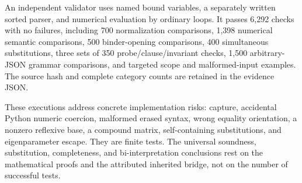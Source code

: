 An independent validator uses named bound variables, a separately
written sorted parser, and numerical evaluation by ordinary loops.
It passes 6,292 checks with no failures, including 700 normalization
comparisons, 1,398 numerical semantic comparisons, 500 binder-opening
comparisons, 400 simultaneous substitutions, three sets of 350
probe/clause/invariant checks, 1,500 arbitrary-JSON grammar comparisons,
and targeted scope and malformed-input examples. The source hash and
complete category counts are retained in the evidence JSON.

These executions address concrete implementation risks: capture,
accidental Python numeric coercion, malformed erased syntax, wrong
equality orientation, a nonzero reflexive base, a compound matrix,
self-containing substitutions, and eigenparameter escape. They are
finite tests. The universal soundness, substitution, completeness, and
bi-interpretation conclusions rest on the mathematical proofs and the
attributed inherited bridge, not on the number of successful tests.
